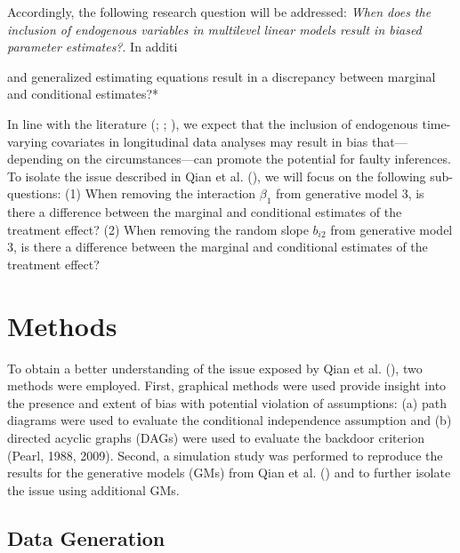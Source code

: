 \documentclass[
  12pt,
  a4paper,
]{article}
\begin{document}
Accordingly, the following research question will be addressed:
\emph{When does the inclusion of endogenous variables in multilevel
linear models result in biased parameter estimates?}. In additi

and generalized estimating equations result in a discrepancy between
marginal and conditional estimates?*

In line with the literature (;
;
), we expect that the
inclusion of endogenous time-varying covariates in longitudinal data
analyses may result in bias that---depending on the circumstances---can
promote the potential for faulty inferences. To isolate the issue
described in Qian et al. (), we will focus
on the following sub-questions: (1) When removing the interaction
\(\beta_1\) from generative model 3, is there a difference between the
marginal and conditional estimates of the treatment effect? (2) When
removing the random slope \(b_{i2}\) from generative model 3, is there a
difference between the marginal and conditional estimates of the
treatment effect?

\newpage

\section{Methods}\label{methods}

To obtain a better understanding of the issue exposed by Qian et al.
(), two methods were employed. First,
graphical methods were used provide insight into the presence and extent
of bias with potential violation of assumptions: (a) path diagrams were
used to evaluate the conditional independence assumption and (b)
directed acyclic graphs (DAGs) were used to evaluate the backdoor
criterion (Pearl, 1988, 2009). Second, a simulation study was performed
to reproduce the results for the generative models (GMs) from Qian et
al. () and to further isolate the issue
using additional GMs.

\subsection{Data Generation}\label{data-generation}
\end{document}
